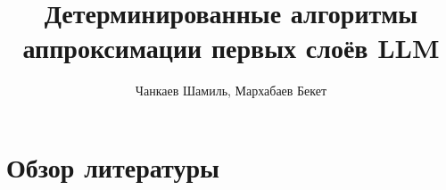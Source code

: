\documentclass[11pt,a4paper]{article}
\title{Детерминированные алгоритмы аппроксимации первых слоёв LLM}
\author{Чанкаев Шамиль, Мархабаев Бекет}
\date{}
\begin{document}
\maketitle

\begin{abstract}
\newtheorem{proposition}{Предложение}

\end{abstract}



\section{Обзор литературы}\label{sec:related}










\end{document}
